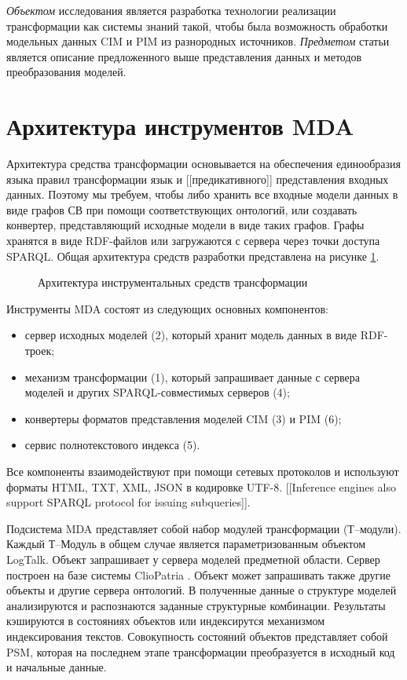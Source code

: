 \documentclass[conference]{IEEEtran} \IEEEoverridecommandlockouts
\begin{document}
\emph{Объектом} исследования является разработка технологии реализации трансформации как системы знаний такой, чтобы была возможность обработки модельных данных CIM и PIM из разнородных источников. \emph{Предметом} статьи является описание предложенного выше представления данных и методов преобразования моделей.

\section{Архитектура инструментов MDA}

Архитектура средства трансформации основывается на обеспечения единообразия языка правил трансформации язык и [[предикативного]] представления входных данных. Поэтому мы требуем, чтобы либо хранить все входные модели данных в виде графов СВ при помощи соответствующих онтологий, или создавать конвертер, представляющий исходные модели в виде таких графов. Графы хранятся в виде RDF-файлов или загружаются с сервера через точки доступа SPARQL. Общая архитектура средств разработки представлена на рисунке \ref{fig:archi}.

\begin{figure}[htb] \centering

  \caption{Архитектура инструментальных средств трансформации} \label{fig:archi} \end{figure}

Инструменты MDA состоят из следующих основных компонентов: \begin{itemize} \item сервер исходных моделей (2), который хранит модель данных в виде RDF-троек; \item механизм трансформации (1), который запрашивает данные с сервера моделей и других SPARQL-совместимых серверов (4); \item конвертеры форматов представления моделей CIM (3) и PIM (6); \item сервис полнотекстового индекса (5). \end{itemize}

Все компоненты взаимодействуют при помощи сетевых протоколов и используют форматы HTML, TXT, XML, JSON в кодировке UTF-8. [[Inference engines also support SPARQL protocol for issuing subqueries]].

Подсистема MDA представляет собой набор модулей трансформации (Т--модули). Каждый Т--Модуль в общем случае является параметризованным объектом LogTalk. Объект запрашивает у сервера моделей предметной области.  Сервер построен на базе системы ClioPatria \cite{Clio}.  Объект может запрашивать также другие объекты и другие сервера онтологий. В полученные данные о структуре моделей анализируются и распознаются заданные структурные комбинации.  Результаты кэшируются в состояниях объектов или индексирутся механизмом индексирования текстов. Совокупность состояний объектов представляет собой PSM, которая на последнем этапе трансформации преобразуется в исходный код и начальные данные.
\end{document}
